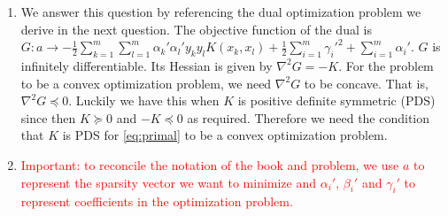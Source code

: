 \begin{enumerate}
\begin{enumerate}
        \item We answer this question by referencing
        the dual optimization problem we derive in the next question.
        The objective function of the dual is
        $G: a \rightarrow 
        -\frac{1}{2} \sum_{k=1}^m\sum_{l=1}^m \alpha_k'
        \alpha_l' y_k y_l K(x_k,x_l)
        + \frac{1}{2} \sum_{i=1}^m \gamma_i'^2
        + \sum_{i=1}^m\alpha_i'$.
        $G$ is infinitely differentiable.
        Its Hessian is given by $\nabla^2G=-K$.
        For the problem to be a convex optimization problem,
        we need $\nabla^2G$ to be concave.
        That is, $\nabla^2G \preceq 0$.
        Luckily we have this when $K$ is positive definite symmetric
        (PDS) since then $K \succeq 0$ and $-K \preceq 0$ as required.
        Therefore we need the condition that $K$ is PDS
        for \autoref{eq:primal} to be a convex optimization problem.

        \item \textcolor{red}{Important: to reconcile the notation of
        the book and problem, we use $a$ to represent the
        sparsity vector we want to minimize and $\alpha_i'$,
        $\beta_i'$ and $\gamma_i'$ to represent coefficients
        in the optimization problem.}


\end{enumerate}
\end{enumerate}
